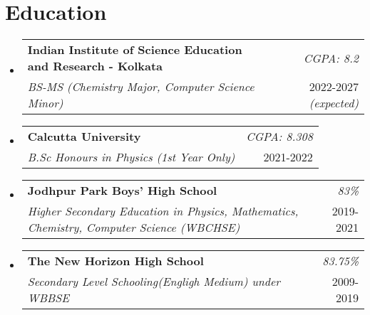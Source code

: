 \documentclass[a4paper,10.8pt]{article}
\makeatletter
\newcommand{\resumeSubheading}[4]{
    \item\small{
        \begin{tabular*}{0.97\textwidth}[t]{l@{\extracolsep{\fill}}r}
            \textbf{#1} & \textit{#2} \\
            \textit{#3} & \small{#4}
        \end{tabular*}
    }\vspace{3pt}
}
\newcommand{\compactSection}[2]{
    \section{#1}
    \vspace{-0.1cm}
    #2
    \vspace{-0.2cm}
}
\makeatother
\begin{document}
\compactSection{Education}{
\begin{itemize}[leftmargin=*,label={},itemsep=3pt]
    \resumeSubheading{Indian Institute of Science Education and Research - Kolkata}{CGPA: 8.2}
    {BS-MS (Chemistry Major, Computer Science Minor)}{2022-2027 \textit{(expected)}}
    \vspace{-5pt}
    \resumeSubheading{Calcutta University}{CGPA: 8.308}
    {B.Sc Honours in Physics (1st Year Only)}{2021-2022}
        \vspace{-5pt}
    \resumeSubheading{Jodhpur Park Boys' High School}{83\%}
    {Higher Secondary Education in Physics, Mathematics, Chemistry, Computer Science (WBCHSE)}{2019-2021}
        \vspace{-5pt}
    \resumeSubheading{The New Horizon High School}{83.75\%}
      {Secondary Level Schooling(Engligh Medium) under WBBSE}{2009-2019}
\end{itemize}}
\end{document}
